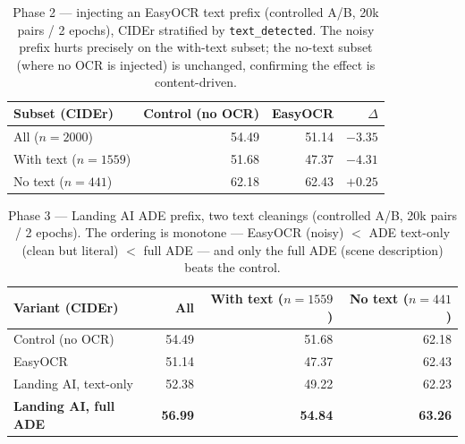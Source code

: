 \begin{table}[t]
  \centering
  \caption{Phase 2 --- injecting an EasyOCR text prefix (controlled A/B, 20k
    pairs / 2 epochs), CIDEr stratified by \texttt{text\_detected}. The noisy
    prefix hurts precisely on the with-text subset; the no-text subset (where no
    OCR is injected) is unchanged, confirming the effect is content-driven.}
  \label{tab:phase2-easyocr}
  \begin{tabular}{lrrr}
    \toprule
    Subset (CIDEr) & Control (no OCR) & EasyOCR & $\Delta$ \\
    \midrule
    All ($n{=}2000$)        & 54.49 & 51.14 & $-3.35$ \\
    With text ($n{=}1559$)  & 51.68 & 47.37 & $-4.31$ \\
    No text ($n{=}441$)     & 62.18 & 62.43 & $+0.25$ \\
    \bottomrule
  \end{tabular}
\end{table}

\begin{table}[t]
  \centering
  \caption{Phase 3 --- Landing AI ADE prefix, two text cleanings (controlled
    A/B, 20k pairs / 2 epochs). The ordering is monotone --- EasyOCR (noisy)
    $<$ ADE text-only (clean but literal) $<$ full ADE --- and only the full ADE
    (scene description) beats the control.}
  \label{tab:phase3-ade}
  \begin{tabular}{lrrr}
    \toprule
    Variant (CIDEr) & All & With text ($n{=}1559$) & No text ($n{=}441$) \\
    \midrule
    Control (no OCR)       & 54.49 & 51.68 & 62.18 \\
    EasyOCR                & 51.14 & 47.37 & 62.43 \\
    Landing AI, text-only  & 52.38 & 49.22 & 62.23 \\
    \textbf{Landing AI, full ADE} & \textbf{56.99} & \textbf{54.84} & \textbf{63.26} \\
    \bottomrule
  \end{tabular}
\end{table}

